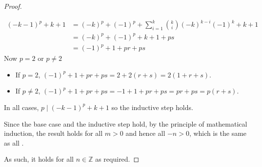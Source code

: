 \documentclass[letterpaper,12pt]{article}
\theoremstyle{definition}
\begin{document}
\begin{enumerate}
\begin{mdframed}
\begin{proof}
\begin{itemize}
\begin{itemize}
\begin{align*}
                         (-k-1)^{p} + k + 1 &= (-k)^p + (-1)^p + \sum_{i=1}^{k}{k \choose i} (-k)^{k-i}(-1)^k +k+1\\
                     &= (-k)^p + (-1)^p +k+1  + ps\\
                     &= (-1)^p +1+pr + ps
                     \end{align*}
                     Now $p=2$ or $p\neq 2$
                     \begin{itemize}
                         \item If $p=2$, $(-1)^p +1+pr + ps = 2+2(r+s) = 2(1+r+s)$.
                         \item If $p\neq 2$, $(-1)^p +1+pr+ps = -1 + 1 +pr+ ps =pr+ ps = p(r+s)$.
                     \end{itemize}
                     In all cases, $p \mid (-k-1)^p +k+1$ so the inductive step holds.
                     \end{itemize}
                        Since the base case and the inductive step hold, by the principle of mathematical induction, the result holds for all $m > 0$ and hence all $-n > 0$, which is the same as all .
                 \end{itemize}
                 As such, it holds for all $n \in \mathbb{Z}$ as required.
         \end{proof}
    \end{mdframed}
\end{enumerate}
\pagebreak
\end{document}
